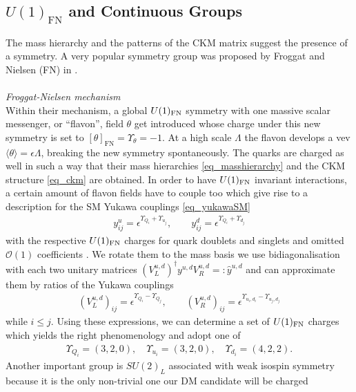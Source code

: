 \subsection{$U(1)_\text{FN}$ and Continuous Groups}
\label{sec_FNGT}
The mass hierarchy and the patterns of the CKM matrix suggest the presence of a symmetry. A very popular symmetry group was proposed
by Froggat and Nielsen (FN) in \cite{FN}. 
\\ \\ \textit{Froggat-Nielsen mechanism}\\
\noindent Within their mechanism, a global $U(1)_\text{FN}$ symmetry with one massive scalar messenger, 
or ``flavon'', field $\theta$ get introduced whose charge under this new symmetry is set to $[\theta]_\text{FN} = \Upsilon_\theta=-1$. At a high scale $\Lambda$ the
flavon develops a vev $\langle \theta \rangle = \epsilon\Lambda$, breaking the new symmetry spontaneously. The quarks are charged as well in such 
a way that their mass hierarchies \eqref{eq_masshierarchy} and the CKM structure \eqref{eq_ckm} are obtained. In order to have $U(1)_\text{FN}$ invariant
interactions, a certain amount of flavon fields have to couple too which give rise to a description for the SM Yukawa couplings \eqref{eq_yukawaSM}
\begin{align}
 y^u_{ij} = \epsilon^{\Upsilon_{Q_i} + \Upsilon_{u_j}},\qquad y^d_{ij} = \epsilon^{\Upsilon_{Q_i} + \Upsilon_{d_j}}
\end{align}
with the respective $U(1)_\text{FN}$ charges for quark doublets and singlets and omitted $\mathcal{O}(1)$ coefficients . We rotate them to the mass basis we 
use bidiagonalisation with each two unitary
matrices ${\left(V_L^{u,d}\right)^\dagger y^{u,d}V_R^{u,d}=:\hat{y}^{u,d}}$ and can approximate them by ratios of the Yukawa couplings \cite{1501.07268}
\begin{align}
 \left(V_L^{u,d}\right)_{ij} = \epsilon^{\Upsilon_{Q_i} - \Upsilon_{Q_j}},\qquad\left(V_R^{u,d}\right)_{ij} = \epsilon^{\Upsilon_{u_i,d_i} - \Upsilon_{u_j,d_j}}
\end{align}
while $i\leq j$. Using these expressions, we can determine a set of $U(1)_\text{FN}$ charges which yields the right phenomenology and adopt one of \cite{0501071}
\begin{align}
 \Upsilon_{Q_i}=(3,2,0),\quad \Upsilon_{u_i}=(3,2,0),\quad \Upsilon_{d_i}=(4,2,2).
 \label{eq_fnchargesQ}
\end{align}
Another important group is $SU(2)_L$ associated with weak isospin symmetry because it is the only non-trivial one our DM candidate will be charged 

